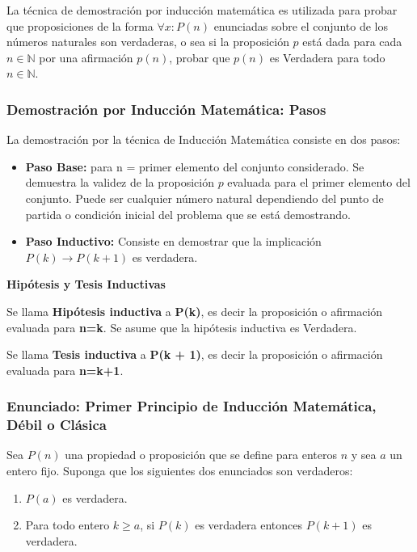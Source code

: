 \documentclass{article}
\begin{document}
La técnica de demostración por inducción matemática es utilizada para probar que proposiciones de la forma $\forall x:P(n)$ enunciadas sobre el conjunto de los números naturales son verdaderas, o sea si la proposición $p$ está dada para cada $n \in \mathbb{N}$ por una afirmación $p(n)$, probar que $p(n)$ es Verdadera para todo $n \in \mathbb{N}$.

\subsubsection{Demostración por Inducción Matemática: Pasos}
\label{sec:pasos-induccion-matematica}
La demostración por la técnica de Inducción Matemática consiste en dos pasos:
\begin{itemize}
\item \textbf{Paso Base:} para n = primer elemento del conjunto considerado. Se demuestra la validez de la proposición $p$ evaluada para el primer elemento del conjunto. Puede ser cualquier número natural dependiendo del punto de partida o condición inicial del problema que se está demostrando.

\item\textbf{Paso Inductivo:} 
Consiste en demostrar que la implicación $P(k) \to P(k + 1)$ es verdadera.
\end{itemize}
\bigskip

\noindent \textbf{Hipótesis y Tesis Inductivas}
\bigskip

\indent Se llama \textbf{Hipótesis inductiva} a \textbf{P(k)}, es decir la proposición o afirmación evaluada para \textbf{n=k}. Se asume que la hipótesis inductiva es Verdadera.
\bigskip

\indent Se llama \textbf{Tesis inductiva} a \textbf{P(k + 1)}, es decir la proposición o afirmación evaluada para \textbf{n=k+1}.

\subsubsection{Enunciado: Primer Principio de Inducción Matemática, Débil o Clásica}
\label{sec:enunciado-induccion-clasica}

Sea $P(n)$ una propiedad o proposición que se define para enteros $n$ y sea $a$ un entero fijo. Suponga que los siguientes dos enunciados son verdaderos:

\begin{enumerate}
    \item $P(a)$ es verdadera.
    \item Para todo entero $k \geq a$, si $P(k)$ es verdadera entonces $P(k + 1)$ es verdadera.
\end{enumerate}
\end{document}

